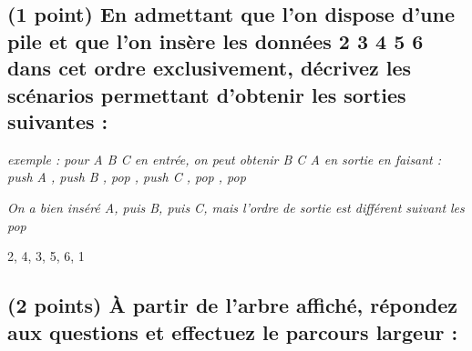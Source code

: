 \documentclass[11pt,a4paper]{article}
\begin{document}
\bigskip


\subsection{(1 point) En admettant que l'on dispose d'une pile et que l'on insère les données  2 3 4 5 6 \fg{} dans cet ordre exclusivement, décrivez les scénarios permettant d'obtenir les sorties suivantes : }

\bigskip

\begin{center}
\noindent \textit{exemple : pour \og A B C \fg{} en entrée, on peut obtenir \og B C A \fg{} en sortie en faisant : \linebreak
\og push A \fg, \og push B \fg, \og pop \fg, \og push C \fg, \og pop \fg, \og pop \fg }

\textit{On a bien inséré A, puis B, puis C, mais l'ordre de sortie est différent suivant les \og pop \fg}
\end{center}

\medskip


\begin{center}

\begin{large}
2, 4, 3, 5, 6, 1
\end{large}

\begin{center}
\end{center}

\end{center}


\clearpage

\subsection{(2 points) \`A partir de l'arbre affiché, répondez aux questions et effectuez le parcours largeur : }
\end{document}
